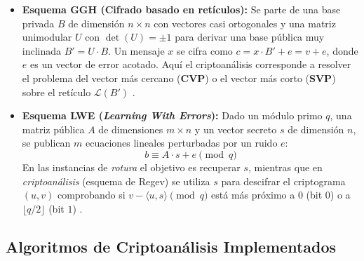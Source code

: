 \documentclass[12pt,a4paper]{article}
\begin{document}
\begin{itemize}
    \item \textbf{Esquema GGH (Cifrado basado en retículos):} Se parte de una base privada $B$ de dimensión $n \times n$ con vectores casi ortogonales y una matriz unimodular $U$ con $\det(U) = \pm 1$ para derivar una base pública muy inclinada $B' = U \cdot B$. Un mensaje $x$ se cifra como $c = x \cdot B' + e = v + e$, donde $e$ es un vector de error acotado. Aquí el criptoanálisis corresponde a resolver el problema del vector más cercano (\textbf{CVP}) o el vector más corto (\textbf{SVP}) sobre el retículo $\mathcal{L}(B')$ \cite{ggh1997}.
    
    \item \textbf{Esquema LWE (\textit{Learning With Errors}):} Dado un módulo primo $q$, una matriz pública $A$ de dimensiones $m \times n$ y un vector secreto $s$ de dimensión $n$, se publican $m$ ecuaciones lineales perturbadas por un ruido $e$:
    \begin{equation}
        b \equiv A \cdot s + e \pmod{q}
    \end{equation}
    En las instancias de \textit{rotura} el objetivo es recuperar $s$, mientras que en \textit{criptoanálisis} (esquema de Regev) se utiliza $s$ para descifrar el criptograma $(u, v)$ comprobando si $v - \langle u, s \rangle \pmod{q}$ está más próximo a $0$ (bit $0$) o a $\lfloor q/2 \rfloor$ (bit $1$) \cite{regev2009}.
\end{itemize}

\subsection{Algoritmos de Criptoanálisis Implementados}
\end{document}
